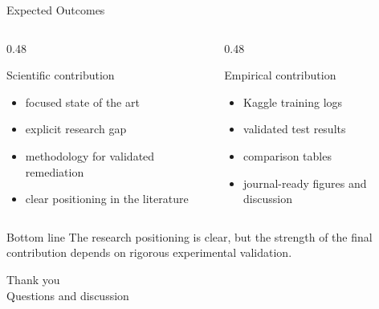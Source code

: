 \documentclass[aspectratio=169,10pt]{beamer}
\begin{document}
\begin{frame}{Expected Outcomes}
\begin{columns}[T]
\begin{column}{0.48\textwidth}
\begin{block}{Scientific contribution}
\small
\begin{itemize}
  \item focused state of the art
  \item explicit research gap
  \item methodology for validated remediation
  \item clear positioning in the literature
\end{itemize}
\end{block}
\end{column}
\begin{column}{0.48\textwidth}
\begin{block}{Empirical contribution}
\small
\begin{itemize}
  \item Kaggle training logs
  \item validated test results
  \item comparison tables
  \item journal-ready figures and discussion
\end{itemize}
\end{block}
\end{column}
\end{columns}
\vspace{0.4cm}
\begin{alertblock}{Bottom line}
The research positioning is clear, but the strength of the final contribution
depends on rigorous experimental validation.
\end{alertblock}
\end{frame}

\begin{frame}
\centering
\vspace{1.5cm}
{\Huge Thank you}\\[0.6cm]
{\large Questions and discussion}
\end{frame}
\end{document}
